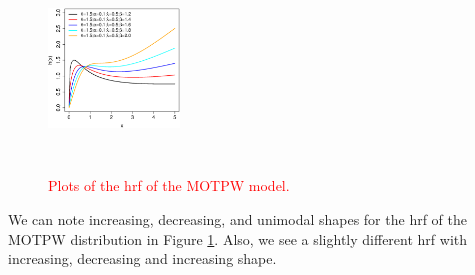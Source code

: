 \documentclass[12pt]{article}
\begin{document}
\begin{figure}[!htb]
\begin{center}
		\includegraphics[width=3.5cm,height=5.5cm]{hrf_MOTPW_variando_beta.eps}
		\caption{\textcolor{red}{Plots of the hrf of the MOTPW model.}}
		\label{hrf}
	\end{center}
\end{figure}
	
{\color{red} We can note increasing, decreasing, and unimodal shapes for the hrf of the MOTPW distribution in Figure \ref{hrf}. 
Also, we see a slightly different hrf with increasing, decreasing and increasing shape.}



%	
	
\end{document}
